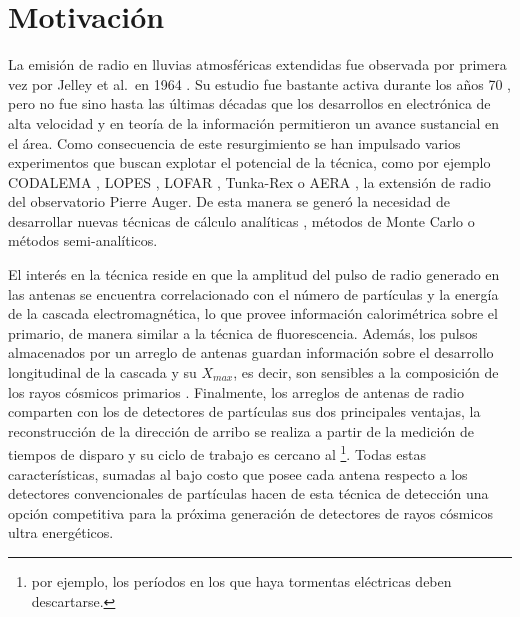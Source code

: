 \chapter*{Motivaci\'on}
\label{ch:motRadio}


La emisi\'on de radio en lluvias atmosf\'ericas extendidas fue observada por primera vez por Jelley et al.\ en 1964 \cite{jelley1966radio}. Su estudio fue bastante activa durante los a\~nos 70 \cite{allan1971progress}, pero no fue sino hasta las \'ultimas d\'ecadas que los desarrollos en electr\'onica de alta velocidad y en teor\'ia de la informaci\'on permitieron un avance sustancial en el \'area.
Como consecuencia de este resurgimiento se han impulsado varios experimentos que buscan explotar el potencial de la t\'ecnica, como por ejemplo CODALEMA \cite{ardouin2005radio}, LOPES \cite{huege2012lopes}, LOFAR \cite{horandel2009lofar}, Tunka-Rex \cite{schroder2013tunka} o AERA \cite{kelley2011aera}, la extensi\'on de radio del observatorio Pierre Auger.
De esta manera se gener\'o la necesidad de desarrollar nuevas t\'ecnicas de c\'alculo anal\'iticas \cite{huege2003radio,scholten2008macroscopic}, m\'etodos de Monte Carlo \cite{huege2007monte,ludwig2011reas3} o m\'etodos semi-anal\'iticos\cite{scholten2009macroscopic}.

El interés en la técnica reside en que la amplitud del pulso de radio generado en las antenas se encuentra correlacionado con el número de partículas y la energía de la cascada electromagnética, lo que provee información calorimétrica sobre el primario, de manera similar a la técnica de fluorescencia.
Adem\'as, los pulsos almacenados por un arreglo de antenas guardan información sobre el desarrollo longitudinal de la cascada y su $X_{max}$, es decir, son sensibles a la composici\'on de los rayos c\'osmicos primarios \cite{cite:hauge_rec,cite:lofar_rec}.
Finalmente, los arreglos de antenas de radio comparten con los de detectores de partículas sus dos principales ventajas, la reconstrucción de la dirección de arribo se realiza a partir de la medición de tiempos de disparo y su ciclo de trabajo es cercano al \footnote{por ejemplo, los períodos en los que haya tormentas eléctricas deben descartarse.}.
Todas estas características, sumadas al bajo costo que posee cada antena respecto a los detectores convencionales de partículas hacen de esta técnica de detección una opción competitiva para la próxima generación de detectores de rayos c\'osmicos ultra energ\'eticos.

